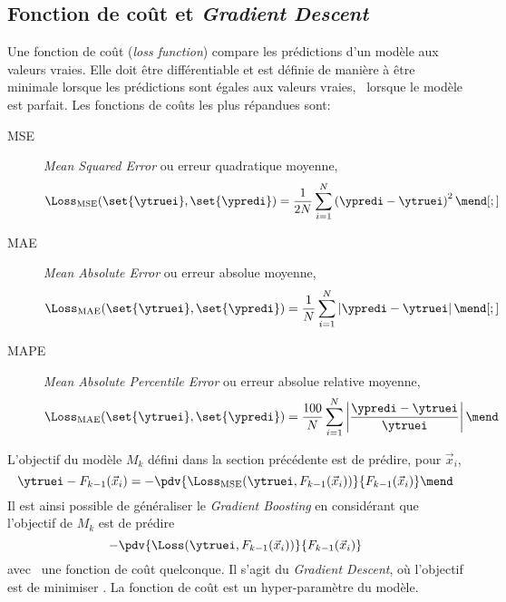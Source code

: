 \subsection{Fonction de coût et \emph{Gradient Descent}}\label{chapter-ML-section-loss}
Une fonction de coût (\emph{loss function}) compare les prédictions d'un modèle aux valeurs vraies.
Elle doit être différentiable et est définie de manière à être minimale lorsque les prédictions sont égales aux valeurs vraies, \ie\ lorsque le modèle est parfait.
Les fonctions de coûts les plus répandues sont:
\begin{description}
\item[MSE] \emph{Mean Squared Error} ou erreur quadratique moyenne,
\begin{equation}
\Loss_\text{MSE}(\set{\ytruei}, \set{\ypredi}) = \frac{1}{2N} \sum_{i=1}^N \left( \ypredi - \ytruei \right)^2
\label{eq-loss_MSE}
\mend[;]
\end{equation}
\item[MAE] \emph{Mean Absolute Error} ou erreur absolue moyenne,
\begin{equation}
\Loss_\text{MAE}(\set{\ytruei}, \set{\ypredi}) = \frac{1}{N} \sum_{i=1}^N \left| \ypredi - \ytruei \right|
\label{eq-loss_MAE}
\mend[;]
\end{equation}
\item[MAPE] \emph{Mean Absolute Percentile Error} ou erreur absolue relative moyenne,
\begin{equation}
\Loss_\text{MAE}(\set{\ytruei}, \set{\ypredi}) = \frac{100}{N} \sum_{i=1}^N \left| \frac{\ypredi - \ytruei}{\ytruei} \right|
\label{eq-loss_MAPE}
\mend
\end{equation}
\end{description}
\par
L'objectif du modèle $M_k$ défini dans la section précédente est de prédire, pour $\vec{x}_i$,
\begin{equation}
\ytruei - F_{k-1}(\vec{x}_i)
=
- \pdv{\Loss_\text{MSE}(\ytruei, F_{k-1}(\vec{x}_i))}{F_{k-1}(\vec{x}_i)}
\mend
\end{equation}
Il est ainsi possible de généraliser le \emph{Gradient Boosting}
en considérant que l'objectif de $M_k$ est de prédire
\begin{equation}
- \pdv{\Loss(\ytruei, F_{k-1}(\vec{x}_i))}{F_{k-1}(\vec{x}_i)}
\end{equation}
avec \Loss\ une fonction de coût quelconque.
Il s'agit du \emph{Gradient Descent},
où l'objectif est de minimiser \Loss.
La fonction de coût est un hyper-paramètre du modèle.
